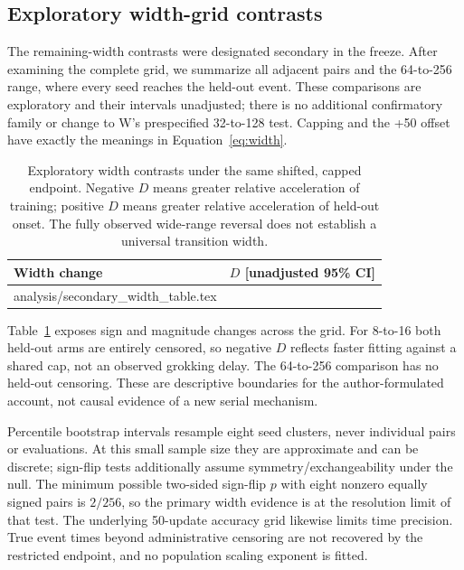 \documentclass{article}
\makeatletter
\let\inputrows\@@input
\makeatother
\begin{document}
\subsection{Exploratory width-grid contrasts}\label{app:widthgrid}
The remaining-width contrasts were designated secondary in the freeze. After examining the complete grid, we summarize all adjacent pairs and the 64-to-256 range, where every seed reaches the held-out event. These comparisons are exploratory and their intervals unadjusted; there is no additional confirmatory family or change to W's prespecified 32-to-128 test. Capping and the +50 offset have exactly the meanings in Equation~\ref{eq:width}.
\begin{table}[ht]\centering\small
\caption{Exploratory width contrasts under the same shifted, capped endpoint. Negative $D$ means greater relative acceleration of training; positive $D$ means greater relative acceleration of held-out onset. The fully observed wide-range reversal does not establish a universal transition width.}\label{tab:widthgrid}
\begin{tabular}{l r}\toprule Width change&$D$ [unadjusted 95\% CI]\\\midrule
\inputrows analysis/secondary_width_table.tex
\bottomrule\end{tabular}\end{table}
Table~\ref{tab:widthgrid} exposes sign and magnitude changes across the grid. For 8-to-16 both held-out arms are entirely censored, so negative $D$ reflects faster fitting against a shared cap, not an observed grokking delay. The 64-to-256 comparison has no held-out censoring. These are descriptive boundaries for the author-formulated account, not causal evidence of a new serial mechanism.

Percentile bootstrap intervals resample eight seed clusters, never individual pairs or evaluations. At this small sample size they are approximate and can be discrete; sign-flip tests additionally assume symmetry/exchangeability under the null. The minimum possible two-sided sign-flip $p$ with eight nonzero equally signed pairs is $2/256$, so the primary width evidence is at the resolution limit of that test. The underlying 50-update accuracy grid likewise limits time precision. True event times beyond administrative censoring are not recovered by the restricted endpoint, and no population scaling exponent is fitted.
\end{document}
